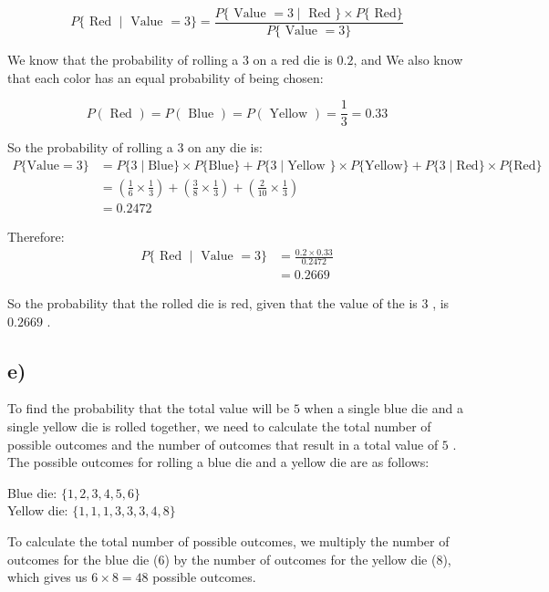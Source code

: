 \documentclass[12pt]{article}
\begin{document}
$$P\{\text  { Red } \mid \text { Value }= 3\}= \frac{P\{\text { Value }=3 \mid \text { Red }\} \times P\{\text { Red} \}}{P\{\text { Value }=3\}} $$

We know that the probability of rolling a $3$ on a red die is $0.2$,
and We also know that each color has an equal probability of being chosen: 

$$P(\text { Red }) =P(\text { Blue }) =P(\text { Yellow }) = \frac{1}{3} = 0.33$$

So the probability of rolling a $3$  on any die is:
\begin{align*}
P\{\text {Value} =3\} &= P\{3 \mid \text {Blue}\} \times P\{\text {Blue}\}+ P\{3 \mid \text {Yellow }\} \times P\{\text {Yellow}\} + P\{ 3 \mid \text {Red}\}\times P\{\text {Red}\} \\
&=( \frac{1}{6} \times \frac{1}{3}) + ( \frac{3}{8} \times \frac{1}{3})+( \frac{2}{10} \times \frac{1}{3})\\
&= 0.2472
\end{align*}


Therefore:
\begin{align*}
P\{\text { Red } \mid \text { Value }=3\} &= \frac{0.2 \times 0.33}{0.2472}\\
&= 0.2669
\end{align*}

So the probability that the rolled die is red, given that the value of the is $3$ , is $0.2669$ .

\subsection*{e)} 
To find the probability that the total value will be $5$ when a single blue die and a single yellow die is rolled together, we need to calculate the total number of possible outcomes and the number of outcomes that result in a total value of $5$ .\\
The possible outcomes for rolling a blue die and a yellow die are as follows:\\
\begin{center}
Blue die: $\{1,2,3,4,5,6\}$\\
Yellow die: $\{1,1,1,3,3,3,4,8\}$\\  
\end{center}

To calculate the total number of possible outcomes, we multiply the number of outcomes for the blue die (6) by the number of outcomes for the yellow die (8), which gives us $6 \times 8 =48$ possible outcomes.
\end{document}
